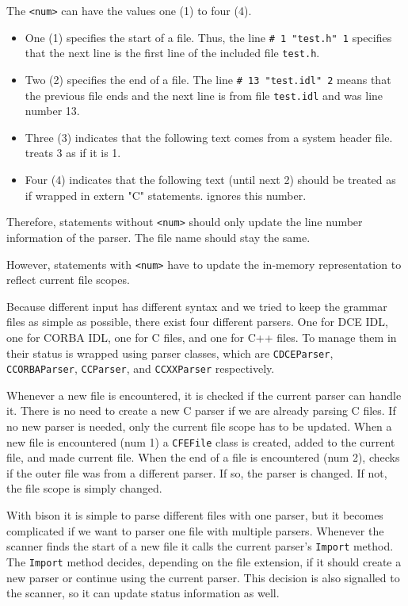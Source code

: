 The \verb|<num>| can have the values one (1) to four (4).  
\begin{itemize}
\item One (1) specifies the start of a file.  Thus, the line 
      \verb|# 1 "test.h" 1| specifies that the next line is the 
      first line of the included file \verb|test.h|.
\item Two (2) specifies the end of a file.  The line 
      \verb|# 13 "test.idl" 2| means that the previous file ends and
      the next line is from file \verb|test.idl| and was line number 13.
\item Three (3) indicates that the following text comes from a system
      header file. \dice{} treats 3 as if it is 1.
\item Four (4) indicates that the following text (until next 2) should
      be treated as if wrapped in extern "C" statements.  \dice{}
      ignores this number.
\end{itemize}

Therefore, statements without \verb|<num>| should only update the line 
number information of the parser.  The file name should stay the same.

However, statements with \verb|<num>| have to update the in-memory 
representation to reflect current file scopes.

Because different input has different syntax and we tried to keep the 
grammar files as simple as possible, there exist four different 
parsers.  One for DCE IDL, one for CORBA IDL, one for C files, and one
for C++ files.  To manage them in \dice{} their status is wrapped
using parser classes, which are \verb|CDCEParser|, \verb|CCORBAParser|,
\verb|CCParser|, and \verb|CCXXParser| respectively.  

Whenever a new file is encountered, it is checked if the current parser
can handle it.  There is no need to create a new C parser if we are
already parsing C files.  If no new parser is needed, only the current
file scope has to be updated.  When a new file is encountered (num 1) a
\verb|CFEFile| class is created, added to the current file, and made
current file.  When the end of a file is encountered (num 2), \dice{}
checks if the outer file was from a different parser.  If so, the parser
is changed.  If not, the file scope is simply changed.

With bison it is simple to parse different files with one parser, but 
it becomes complicated if we want to parser one file with multiple
parsers.  Whenever the scanner finds the start of a new file it calls
the current parser's \verb|Import| method.  The \verb|Import| method
decides, depending on the file extension, if it should create a new
parser or continue using the current parser.  This decision is also
signalled to the scanner, so it can update status information as well.

